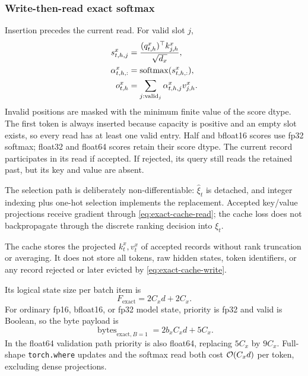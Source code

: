 \subsubsection{Write-then-read exact softmax}

Insertion precedes the current read.  For valid slot \(j\),
\begin{align}
  s_{t,h,j}^x
    &=
    \frac{(q_{t,h}^x)^\top k_{j,h}^x}{\sqrt{d_x}}, \\
  \alpha_{t,h,:}^x
    &=\operatorname{softmax}(s_{t,h,:}^x), \\
  o_{t,h}^x
    &=\sum_{j:\mathrm{valid}_j}
      \alpha_{t,h,j}^x v_{j,h}^x.
  \label{eq:exact-cache-read}
\end{align}
Invalid positions are masked with the minimum finite value of the score dtype.
The first token is always inserted because capacity is positive and an empty
slot exists, so every read has at least one valid entry.  Half and bfloat16
scores use fp32 softmax; float32 and float64 scores retain their score dtype.
The current record participates in its read if accepted.  If rejected, its
query still reads the retained past, but its key and value are absent.

The selection path is deliberately non-differentiable:
\(\widehat\xi_t\) is detached, and integer indexing plus one-hot selection
implements the replacement.  Accepted key/value projections receive gradient
through \eqref{eq:exact-cache-read}; the cache loss does not backpropagate
through the discrete ranking decision into \(\xi_t\).

\begin{remark}
The cache stores the projected \(k_t^x,v_t^x\) of accepted records without
rank truncation or averaging.  It does not store all tokens, raw hidden states,
token identifiers, or any record rejected or later evicted by
\eqref{eq:exact-cache-write}.
\end{remark}

Its logical state size per batch item is
\begin{equation}
  F_{\mathrm{exact}}
  =
  2C_xd+2C_x.
  \label{eq:exact-cache-state-elements}
\end{equation}
For ordinary fp16, bfloat16, or fp32 model state, priority is fp32 and valid is
Boolean, so the byte payload is
\begin{equation}
  \operatorname{bytes}_{\mathrm{exact},B=1}
  =
  2b_xC_xd+5C_x.
  \label{eq:exact-cache-state-bytes}
\end{equation}
In the float64 validation path priority is also float64, replacing \(5C_x\)
by \(9C_x\).  Full-shape \texttt{torch.where} updates and the softmax read
both cost \(\mathcal{O}(C_xd)\) per token, excluding dense projections.

